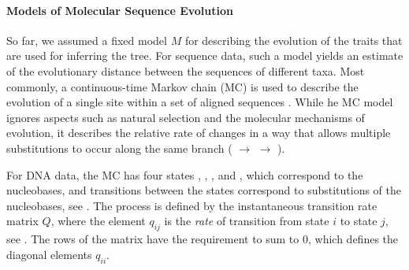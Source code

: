 \paragraph{Models of Molecular Sequence Evolution}
\label{ch:Foundations:sec:TreeOfLife:sub:TreeInference:par:ModelsOfSeqEvol}

So far, we assumed a fixed model $M$ for describing the evolution of the traits that are used for inferring the tree.
For sequence data, such a model yields an estimate of the evolutionary distance between the sequences of different taxa.
Most commonly, a continuous-time Markov chain (MC) is used to describe
the evolution of a single site within a set of aligned sequences \cite{Gagniuc2017}.
While he MC model ignores aspects such as natural selection and the molecular mechanisms of evolution,
it describes the relative rate of changes in a way that allows multiple substitutions to occur
along the same branch ( $\rightarrow$  $\rightarrow$ ).

For DNA data, the MC has four states , , , and ,
which correspond to the nucleobases,
and transitions between the states correspond to substitutions of the nucleobases,
see .
The process is defined by the instantaneous transition rate matrix $Q$,
where the element $q_{ij}$ is the \emph{rate} of transition from state $i$ to state $j$,
see .
The rows of the matrix have the requirement to sum to $0$,
which defines the diagonal elements $q_{ii}$.

